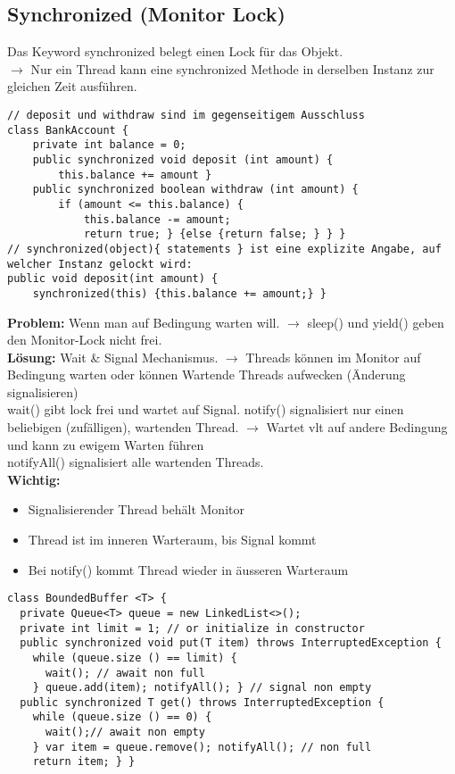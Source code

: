 \subsection{Synchronized (Monitor Lock)}
Das Keyword \textcolor{b}{synchronized} belegt einen Lock für das Objekt.\\
$\rightarrow$ Nur ein Thread kann eine synchronized Methode in derselben Instanz zur gleichen Zeit ausführen.
\begin{lstlisting}
// deposit und withdraw sind im gegenseitigem Ausschluss
class BankAccount {
    private int balance = 0;
    public synchronized void deposit (int amount) {
        this.balance += amount }
    public synchronized boolean withdraw (int amount) {
        if (amount <= this.balance) {
            this.balance -= amount;
            return true; } {else {return false; } } }
// synchronized(object){ statements } ist eine explizite Angabe, auf welcher Instanz gelockt wird:
public void deposit(int amount) {
    synchronized(this) {this.balance += amount;} }
\end{lstlisting}
\textbf{Problem:} Wenn man auf Bedingung warten will. $\rightarrow$ \textcolor{b}{sleep()} und \textcolor{b}{yield()} geben den Monitor-Lock nicht frei.\\
\textbf{Lösung:} Wait \& Signal Mechanismus. $\rightarrow$ Threads können im Monitor auf Bedingung warten oder können Wartende Threads aufwecken (Änderung signalisieren)\\
\textcolor{b}{wait()} gibt lock frei und wartet auf Signal. \textcolor{b}{notify()} signalisiert nur einen beliebigen (zufälligen), wartenden Thread. $\rightarrow$ Wartet vlt auf andere Bedingung und kann zu ewigem Warten führen\\
\textcolor{b}{notifyAll()} signalisiert alle wartenden Threads.\\
\textbf{Wichtig:}
\begin{itemize}[topsep=0pt, leftmargin=3mm]
    \setlength\itemsep{-0.3em}
    \item Signalisierender Thread behält Monitor
    \item Thread ist im inneren Warteraum, bis Signal kommt
    \item Bei notify() kommt Thread wieder in äusseren Warteraum
\end{itemize}
\begin{lstlisting}
class BoundedBuffer <T> {
  private Queue<T> queue = new LinkedList<>();
  private int limit = 1; // or initialize in constructor
  public synchronized void put(T item) throws InterruptedException {
    while (queue.size () == limit) {
      wait(); // await non full
    } queue.add(item); notifyAll(); } // signal non empty
  public synchronized T get() throws InterruptedException {
    while (queue.size () == 0) {
      wait();// await non empty
    } var item = queue.remove(); notifyAll(); // non full
    return item; } }
\end{lstlisting}